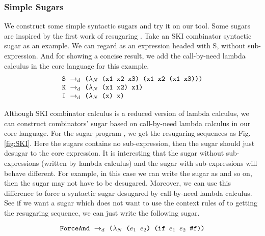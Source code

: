\subsubsection{Simple Sugars}
\label{mark:simple}

We construct some simple syntactic sugars and try it on our tool. Some sugars are inspired by the first work of resugaring \cite{resugaring}. 
Take an SKI combinator syntactic sugar as an example. We can regard  as an expression headed with S, without sub-expression. And for showing a concise result, we add the call-by-need lambda calculus in the core language for this example.
\[
\begin{array}{l}
\mbox{\tt S} ~\rightarrow_d~ \texttt{($\lambda_N$ (x1 x2 x3) (x1 x2 (x1 x3)))}\\
\mbox{\tt K} ~\rightarrow_d~ \texttt{($\lambda_N$ (x1 x2) x1)}\\
\mbox{\tt I} ~\rightarrow_d~ \texttt{($\lambda_N$ (x) x)}
\end{array}
\]




Although SKI combinator calculus is a reduced version of lambda calculus, we can construct combinators' sugar based on call-by-need lambda calculus in our core language. For the sugar program , we get the resugaring sequences as Fig.  \ref{fig:SKI}. Here the sugars contains no sub-expression, then the sugar should just desugar to the core expression. It is interesting that the sugar without sub-expressions (written by lambda calculus) and the sugar with sub-expressions will behave different. For example, in this case we can write the sugar as  and so on, then the sugar may not have to be desugared. Moreover, we can use this difference to force a syntactic sugar desugared by call-by-need lambda calculus. See if we want a sugar  which does not
want to use the context rules of  to getting the resugaring sequence, we can just write the following sugar.

\[
\texttt{ForceAnd} ~\rightarrow_d~ \texttt{($\lambda_N$ ($e_1$ $e_2$) (if $e_1$ $e_2$ \#f))}
\]





